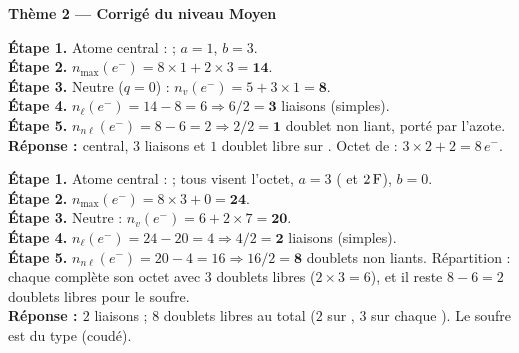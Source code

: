 \documentclass[11pt,a4paper]{article}
\newcommand{\nmax}{n_{\max}(e^-)}
\newcommand{\nv}{n_{v}(e^-)}
\newcommand{\nl}{n_{\ell}(e^-)}
\newcommand{\nnl}{n_{n\ell}(e^-)}
\newcommand{\rep}{\textbf{\textcolor{corcol}{Réponse : }}}
\begin{document}
\begin{center}
{\Large\bfseries\color{primarydark}Thème 2 — Corrigé du niveau Moyen}
\end{center}
\medskip

\begin{cor}[l'ammoniac \ce{NH3}]
\textbf{Étape 1.} Atome central :  ; $a=1$, $b=3$.\\
\textbf{Étape 2.} $\nmax = 8\times 1 + 2\times 3 = \mathbf{14}$.\\
\textbf{Étape 3.} Neutre ($q=0$) : $\nv = 5 + 3\times 1 = \mathbf{8}$.\\
\textbf{Étape 4.} $\nl = 14 - 8 = 6 \Rightarrow 6/2 = \mathbf{3}$ liaisons  (simples).\\
\textbf{Étape 5.} $\nnl = 8 - 6 = 2 \Rightarrow 2/2 = \mathbf{1}$ doublet non liant, porté par
l'azote.\\
\rep {} central, $3$ liaisons  et $1$ doublet libre sur . Octet de  :
$3\times 2 + 2 = 8\,e^-$. \checkmark
\end{cor}

\begin{cor}
\textbf{Étape 1.} Atome central :  ; tous visent l'octet, $a=3$ ( et $2\,\ce{F}$),
$b=0$.\\
\textbf{Étape 2.} $\nmax = 8\times 3 + 0 = \mathbf{24}$.\\
\textbf{Étape 3.} Neutre : $\nv = 6 + 2\times 7 = \mathbf{20}$.\\
\textbf{Étape 4.} $\nl = 24 - 20 = 4 \Rightarrow 4/2 = \mathbf{2}$ liaisons  (simples).\\
\textbf{Étape 5.} $\nnl = 20 - 4 = 16 \Rightarrow 16/2 = \mathbf{8}$ doublets non liants.
Répartition : chaque  complète son octet avec $3$ doublets libres ($2\times 3 = 6$), et il
reste $8 - 6 = 2$ doublets libres pour le soufre.\\
\rep $2$ liaisons  ; $8$ doublets libres au total ($2$ sur , $3$ sur chaque ).
Le soufre est du type  (coudé).
\end{cor}
\end{document}
